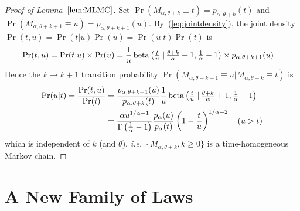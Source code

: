 \documentclass[a4paper,12pt]{article}
\begin{document}
{{\begin{proof}[Proof of Lemma~$\ref{lem:MLMC}$]
\label{proof:MLMC}
Set $\Pr(M_{\alpha,\theta+k} \equiv t) = p_{\alpha,\theta+k}(t)$ and $\Pr(M_{\alpha,\theta+k+1} \equiv u)= p_{\alpha,\theta+k+1}(u)$.
By~(\ref{eq:jointdensity}), the joint density  $\Pr(t,u)=\Pr(t\vert u)\Pr(u)= \Pr(u \vert t)  \Pr(t)$ is 
\begin{align*} 
\Pr(t,u) &=  \Pr(t\vert u)\times\Pr(u) 
  = \frac{1}{u} \, {\rm beta}\left(\tfrac{t}{u} \left.\right\vert \tfrac{\theta+k}{\alpha}+1, \tfrac{1}{\alpha}-1\right)\times
p_{\alpha,\theta+k+1}(u)
\end{align*}
Hence the $k\to k+1$ transition probability  $\Pr(M_{\alpha,\theta+k+1}\equiv u \vert  M_{\alpha,\theta+k}\equiv t)$ is
\begin{align*} 
\Pr(u \vert t)  
= \frac{\Pr(t, u)}{\Pr(t)}%
&= \frac{p_{\alpha,\theta+k+1}(u)}{p_{\alpha,\theta+k}(t)}  \frac{1}{u} \,
{\rm beta}\left(\tfrac{t}{u} \left.\right\vert \tfrac{\theta+k}{\alpha}+1, \tfrac{1}{\alpha}-1\right) \\
&= \frac{\alpha  u^{1/\alpha-1}}{\Gamma\left(\tfrac{1}{\alpha}-1\right)} \frac{p_\alpha(u)}{p_\alpha(t)} \left(1-\frac{t}{u}\right)^{1/\alpha-2} 
\quad (u>t)
\end{align*}
which is independent of $k$ (and $\theta$), {\it  i.e.}\ $\{M_{\alpha,\theta+k}, k\ge0\}$ is a time-homogeneous Markov chain.
\end{proof}

\section{A New Family of Laws}
\label{sec:new_family}
 
 
}}
\end{document}
